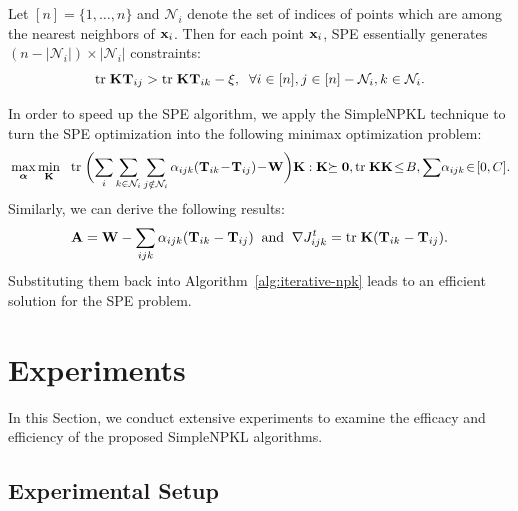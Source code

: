 Let $[n] = \{1,\ldots,n\}$ and $\mathcal N_i$ denote the set of indices of points which
are among the nearest neighbors of ${\bf x}_i$. Then for each point ${\bf x}_i$, SPE essentially
generates $(n - |\mathcal N_i|) \times |\mathcal N_i|$ constraints:
\[
{\mbox{tr}\;}{\bf K} {\bf T}_{ij} > {\mbox{tr}\;}{\bf K} {\bf T}_{ik} - \xi,\;\;\forall i \in [n], j \in [n] - \mathcal N_i, k \in \mathcal N_{i}.
\]

In order to speed up the SPE algorithm, we apply the SimpleNPKL technique to turn the SPE optimization into the following minimax optimization problem:
\begin{eqnarray}
&\max_{\ba}\min_\K& \!\tr\bigg( \!\sum_{i} \sum_{k \in \mathcal N_i} \sum_{j \notin \mathcal N_i} \a_{ijk}(\T_{ik} \!-\! \T_{ij}) \!-\! \mathbf W\bigg)\K : \K\psd, \tr\K\K \!\leq\! B, \sum\!\a_{ijk} \!\in\! [0, C]. \nonumber
\end{eqnarray}
Similarly, we can derive the following results:
\[
{\bf A} = \mathbf W - \sum_{ijk} {\alpha}_{ijk}({\bf T}_{ik} - {\bf T}_{ij}) \;\;\mbox{and}\;\; \nabla J^t_{ijk} = {\mbox{tr}\;}{\bf K}({\bf T}_{ik} - {\bf T}_{ij}).
\]
Substituting them back into Algorithm~\ref{alg:iterative-npk} leads to an efficient solution for the SPE problem.

\newpage


\section{Experiments} \label{sec:expt}
In this Section, we conduct extensive experiments to examine the efficacy and efficiency of the proposed SimpleNPKL algorithms.\vspace{-0.1in}
\subsection{Experimental Setup}

